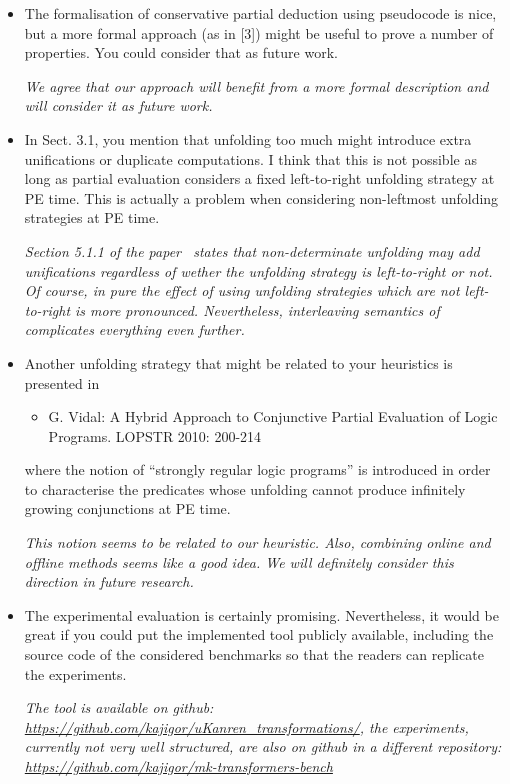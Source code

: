\begin{itemize}
  \item The formalisation of conservative partial deduction using pseudocode is nice, but a more formal approach (as in [3]) might be useful to prove a number of properties. You could consider that as future work.

  \emph{We agree that our approach will benefit from a more formal description and will consider it as future work.}

  \item{In Sect. 3.1, you mention that unfolding too much might introduce extra unifications or duplicate computations. I think that this is not possible as long as partial evaluation considers a fixed left-to-right unfolding strategy at PE time. This is actually a problem when considering non-leftmost unfolding strategies at PE time.}

  \emph{Section 5.1.1 of the paper~\cite{de1999conjunctive} states that non-determinate unfolding may add unifications regardless of wether the unfolding strategy is left-to-right or not. Of course, in pure \pro the effect of using unfolding strategies which are not left-to-right is more pronounced. Nevertheless, interleaving semantics of \mk complicates everything even further.}

  \item Another unfolding strategy that might be related to your heuristics
  is presented in

  \begin{itemize}
    \item G. Vidal: A Hybrid Approach to Conjunctive Partial Evaluation of Logic
    Programs. LOPSTR 2010: 200-214
  \end{itemize}

  where the notion of ``strongly regular logic programs'' is introduced in order to characterise the predicates whose unfolding cannot produce infinitely growing conjunctions at PE time.

  \emph{This notion seems to be related to our heuristic. Also, combining online and offline methods seems like a good idea. We will definitely consider this direction in future research.}

  \item {The experimental evaluation is certainly promising. Nevertheless,
  it would be great if you could put the implemented tool publicly available,
  including the source code of the considered benchmarks so that the readers
  can replicate the experiments.}

  \emph{The tool is available on github: \url{https://github.com/kajigor/uKanren_transformations/}, the experiments, currently not very well structured, are also on github in a different repository: \url{https://github.com/kajigor/mk-transformers-bench}}
\end{itemize}
